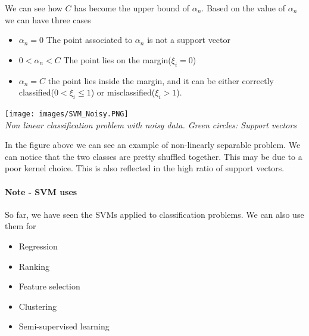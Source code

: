 \documentclass[../main.tex]{subfiles}
\begin{document}
We can see how $C$ has become the upper bound of $\alpha_n$. Based on the value of $\alpha_n$ we can have three cases
\begin{itemize}
    \item $\alpha_n = 0$ The point associated to $\alpha_n$ is not a support vector
    \item $0 < \alpha_n < C$ The point lies on the margin($\xi_i = 0$)
    \item $\alpha_n = C$ the point lies inside the margin, and it can be either correctly classified($0 < \xi_i \leq 1$) or misclassified($\xi_i > 1$)\footnotemark. 
\end{itemize}
\begin{center}
    \texttt{[image: images/SVM\_Noisy.PNG]} \\
    \textit{Non linear classification problem with noisy data. Green circles: Support vectors}\\
\end{center}
In the figure above we can see an example of non-linearly separable problem. We can notice that the two classes are pretty shuffled together. This may be due to a poor kernel choice. This is also reflected in the high ratio of support vectors.
\paragraph{Note - SVM uses} So far, we have seen the SVMs applied to classification problems. We can also use them for
\begin{itemize}
    \item Regression
    \item Ranking
    \item Feature selection
    \item Clustering
    \item Semi-supervised learning
\end{itemize}

\newpage
\end{document}
